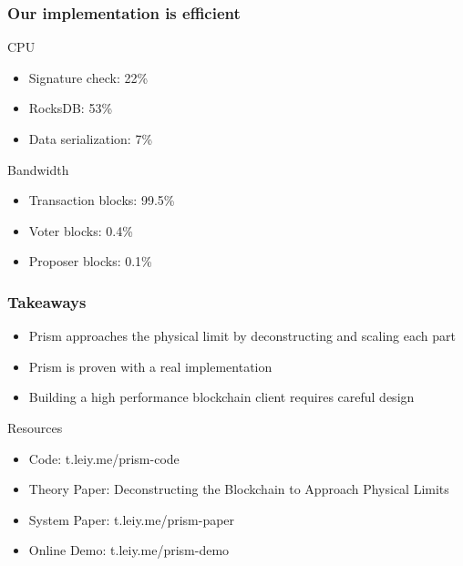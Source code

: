 \documentclass[svgnames]{beamer}
\begin{document}
\begin{frame}
    \frametitle{Our implementation is efficient}
    \begin{block}{CPU}
    \begin{itemize}
        \item Signature check: 22\%
        \item RocksDB: 53\%
        \item Data serialization: 7\%
    \end{itemize}
    \end{block}
    \begin{block}{Bandwidth}
    \begin{itemize}
        \item Transaction blocks: 99.5\%
        \item Voter blocks: 0.4\%
        \item Proposer blocks: 0.1\%
    \end{itemize}
    \end{block}
\end{frame}

\begin{frame}
    \frametitle{Takeaways}
    \begin{block}{}
    \begin{itemize}
        \item Prism approaches the physical limit by deconstructing and scaling each part
        \item Prism is proven with a real implementation
        \item Building a high performance blockchain client requires careful design
    \end{itemize}
    \end{block}
    \begin{block}{Resources}
    \begin{itemize}
        \item Code: t.leiy.me/prism-code
        \item Theory Paper: Deconstructing the Blockchain to Approach Physical Limits
        \item System Paper: t.leiy.me/prism-paper
        \item Online Demo: t.leiy.me/prism-demo
    \end{itemize}
    \end{block}
\end{frame}
\end{document}
